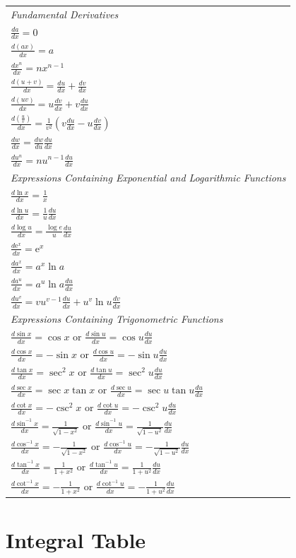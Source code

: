 \documentclass[
]{book}
\begin{document}
\begin{longtable}[]{@{}l@{}}
\toprule
\endhead
\emph{Fundamental Derivatives}\tabularnewline
\(\frac{da}{dx} = 0\)\tabularnewline
\(\frac{d\left(ax\right)}{dx} = a\)\tabularnewline
\(\frac{dx^n}{dx} = nx^{n-1}\)\tabularnewline
\(\frac{d\left(u + v \right)}{dx} = \frac{du}{dx} + \frac{dv}{dx}\)\tabularnewline
\(\frac{d\left(uv \right)}{dx} = u\frac{dv}{dx} + v\frac{du}{dx}\)\tabularnewline
\(\frac{d\left(\frac{u}{v} \right)}{dx} = \frac{1}{v^2} \left( v\frac{du}{dx} - u\frac{dv}{dx} \right)\)\tabularnewline
\(\frac{dw}{dx} = \frac{dw}{du}\frac{du}{dx}\)\tabularnewline
\(\frac{du^n}{dx} = nu^{n-1}\frac{du}{dx}\)\tabularnewline
\emph{Expressions Containing Exponential and Logarithmic Functions}\tabularnewline
\(\frac{d \ln{x}}{dx} = \frac{1}{x}\)\tabularnewline
\(\frac{d \ln{u}}{dx} = \frac{1}{u}\frac{du}{dx}\)\tabularnewline
\(\frac{d \log{u}}{dx} = \frac{\log{e}}{u}\frac{du}{dx}\)\tabularnewline
\(\frac{d\mathrm{e}^x}{dx} = \mathrm{e}^x\)\tabularnewline
\(\frac{da^x}{dx} = a^x \ln{a}\)\tabularnewline
\(\frac{da^u}{dx} = a^u \ln{a}\frac{du}{dx}\)\tabularnewline
\(\frac{du^v}{dx} = vu^{v-1}\frac{du}{dx} + u^v \ln{u}\frac{dv}{dx}\)\tabularnewline
\emph{Expressions Containing Trigonometric Functions}\tabularnewline
\(\frac{d \sin{x}}{dx} = \cos{x} \text{ or } \frac{d \sin{u}}{dx} = \cos{u}\frac{du}{dx}\)\tabularnewline
\(\frac{d \cos{x}}{dx} = -\sin{x} \text{ or } \frac{d \cos{u}}{dx} = -\sin{u}\frac{du}{dx}\)\tabularnewline
\(\frac{d \tan{x}}{dx} = \sec^2{x} \text{ or } \frac{d \tan{u}}{dx} = \sec^2{u}\frac{du}{dx}\)\tabularnewline
\(\frac{d \sec{x}}{dx} = \sec{x}\tan{x} \text{ or } \frac{d \sec{u}}{dx} = \sec{u}\tan{u}\frac{du}{dx}\)\tabularnewline
\(\frac{d \cot{x}}{dx} = -\csc^2{x} \text{ or } \frac{d \cot{u}}{dx} = -\csc^2{u}\frac{du}{dx}\)\tabularnewline
\(\frac{d \sin^{-1}{x}}{dx} = \frac{1}{\sqrt{1-x^2}} \text{ or } \frac{d \sin^{-1}{u}}{dx} = \frac{1}{\sqrt{1-u^2}}\frac{du}{dx}\)\tabularnewline
\(\frac{d \cos^{-1}{x}}{dx} = -\frac{1}{\sqrt{1-x^2}} \text{ or } \frac{d \cos^{-1}{u}}{dx} = -\frac{1}{\sqrt{1-u^2}}\frac{du}{dx}\)\tabularnewline
\(\frac{d \tan^{-1}{x}}{dx} = \frac{1}{1+x^2} \text{ or } \frac{d \tan^{-1}{u}}{dx} = \frac{1}{1+u^2}\frac{du}{dx}\)\tabularnewline
\(\frac{d \cot^{-1}{x}}{dx} = -\frac{1}{1+x^2} \text{ or } \frac{d \cot^{-1}{u}}{dx} = -\frac{1}{1+u^2}\frac{du}{dx}\)\tabularnewline
\bottomrule
\end{longtable}

\hypertarget{integral-table}{%
\section{Integral Table}\label{integral-table}}
\end{document}
